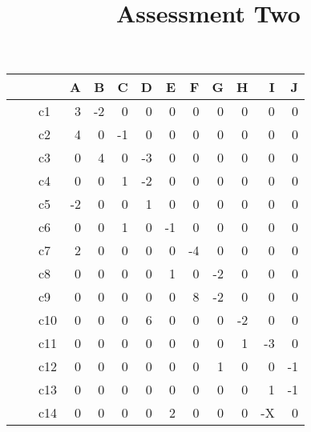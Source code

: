 \documentclass{article}
\begin{document}
\title{Assessment Two}
\maketitle

\section{}
\subsection{}

\begin{table}[H]
  \centering
  \begin{tabular}{|l|rrrrrrrrrr|}
    \hline
    ~   & A  & B  & C  & D  & E  & F  & G  & H  & I  & J  \\ \hline
    c1  &  3 & -2 &  0 &  0 &  0 &  0 &  0 &  0 &  0 &  0 \\ 
    c2  &  4 &  0 & -1 &  0 &  0 &  0 &  0 &  0 &  0 &  0 \\ 
    c3  &  0 &  4 &  0 & -3 &  0 &  0 &  0 &  0 &  0 &  0 \\ 
    c4  &  0 &  0 &  1 & -2 &  0 &  0 &  0 &  0 &  0 &  0 \\ 
    c5  & -2 &  0 &  0 &  1 &  0 &  0 &  0 &  0 &  0 &  0 \\ 
    c6  &  0 &  0 &  1 &  0 & -1 &  0 &  0 &  0 &  0 &  0 \\ 
    c7  &  2 &  0 &  0 &  0 &  0 & -4 &  0 &  0 &  0 &  0 \\ 
    c8  &  0 &  0 &  0 &  0 &  1 &  0 & -2 &  0 &  0 &  0 \\ 
    c9  &  0 &  0 &  0 &  0 &  0 &  8 & -2 &  0 &  0 &  0 \\ 
    c10 &  0 &  0 &  0 &  6 &  0 &  0 &  0 & -2 &  0 &  0 \\ 
    c11 &  0 &  0 &  0 &  0 &  0 &  0 &  0 &  1 & -3 &  0 \\ 
    c12 &  0 &  0 &  0 &  0 &  0 &  0 &  1 &  0 &  0 & -1 \\ 
    c13 &  0 &  0 &  0 &  0 &  0 &  0 &  0 &  0 &  1 & -1 \\ 
    c14 &  0 &  0 &  0 &  0 &  2 &  0 &  0 &  0 & -X &  0\\ \hline
\end{tabular}
\end{table}
\end{document}
